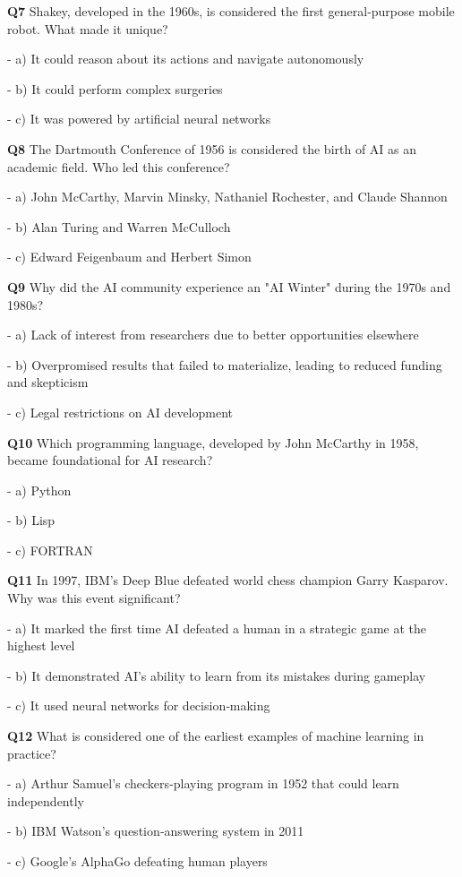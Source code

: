 \textbf{Q7} Shakey, developed in the 1960s, is considered the first general‑purpose mobile robot. What made it unique?\par
\quad - a) It could reason about its actions and navigate autonomously\par
\quad - b) It could perform complex surgeries\par
\quad - c) It was powered by artificial neural networks\par

\textbf{Q8} The Dartmouth Conference of 1956 is considered the birth of AI as an academic field. Who led this conference?\par
\quad - a) John McCarthy, Marvin Minsky, Nathaniel Rochester, and Claude Shannon\par
\quad - b) Alan Turing and Warren McCulloch\par
\quad - c) Edward Feigenbaum and Herbert Simon\par

\textbf{Q9} Why did the AI community experience an "AI Winter" during the 1970s and 1980s?\par
\quad - a) Lack of interest from researchers due to better opportunities elsewhere\par
\quad - b) Overpromised results that failed to materialize, leading to reduced funding and skepticism\par
\quad - c) Legal restrictions on AI development\par

\textbf{Q10} Which programming language, developed by John McCarthy in 1958, became foundational for AI research?\par
\quad - a) Python\par
\quad - b) Lisp\par
\quad - c) FORTRAN\par

\textbf{Q11} In 1997, IBM's Deep Blue defeated world chess champion Garry Kasparov. Why was this event significant?\par
\quad - a) It marked the first time AI defeated a human in a strategic game at the highest level\par
\quad - b) It demonstrated AI's ability to learn from its mistakes during gameplay\par
\quad - c) It used neural networks for decision‑making\par

\textbf{Q12} What is considered one of the earliest examples of machine learning in practice?\par
\quad - a) Arthur Samuel's checkers‑playing program in 1952 that could learn independently\par
\quad - b) IBM Watson's question‑answering system in 2011\par
\quad - c) Google's AlphaGo defeating human players\par

